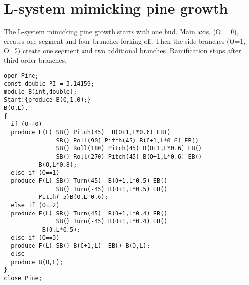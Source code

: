 \section{L-system mimicking pine growth}\label{sec:L1}
The L-system mimicking pine growth starts with one bud.  Main axis, (O
= 0),  creates one  segment and four  branches forking off.   Then the
side  branches  (O=1,  O=2)  create  one segment  and  two  additional
branches.  Ramification stops after third order branches.

\begin{verbatim}
open Pine;
const double PI = 3.14159; 
module B(int,double);
Start:{produce B(0,1.0);}
B(O,L):
{
  if (O==0)
  produce F(L) SB() Pitch(45)  B(O+1,L*0.6) EB() 
               SB() Roll(90) Pitch(45) B(O+1,L*0.6) EB()
               SB() Roll(180) Pitch(45) B(O+1,L*0.6) EB() 
               SB() Roll(270) Pitch(45) B(O+1,L*0.6) EB()
          B(O,L*0.8);
  else if (O==1)
  produce F(L) SB() Turn(45)  B(O+1,L*0.5) EB() 
               SB() Turn(-45) B(O+1,L*0.5) EB()
          Pitch(-5)B(O,L*0.6);
  else if (O==2)
  produce F(L) SB() Turn(45)  B(O+1,L*0.4) EB() 
               SB() Turn(-45) B(O+1,L*0.4) EB()
           B(O,L*0.5);
  else if (O==3)
  produce F(L) SB() B(O+1,L)  EB() B(O,L);
  else
  produce B(O,L);          
}
close Pine;
\end{verbatim}
